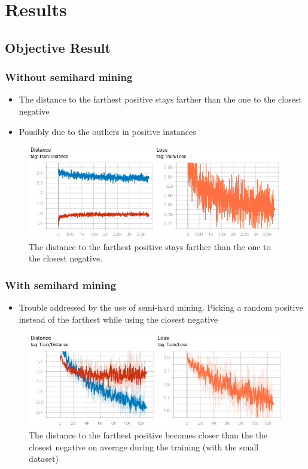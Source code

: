
\chapter{Results}

\section{Objective Result}
\subsection{Without semihard mining}
\begin{itemize}
    \item The distance to the farthest positive stays farther than the one to the closest negative
    \item Possibly due to the outliers in positive instances
\end{itemize}

\begin{figure}[htb]
	\centering
	\includegraphics[width=15cm]{Figures/bad_distance.png}
	\caption{The distance to the farthest positive stays farther than the one to the closest negative.}
	\label{bad_distance}
\end{figure}

\subsection{With semihard mining}
\begin{itemize}
    \item Trouble addressed by the use of semi-hard mining. Picking a random positive instead of the farthest while using the closest negative
\end{itemize}

\begin{figure}[htb]
	\centering
	\includegraphics[width=15cm]{Figures/good_distance.png}
	\caption{The distance to the farthest positive becomes closer than the the closest negative on average during the training (with the small dataset)}
	\label{good_distance}
\end{figure}

